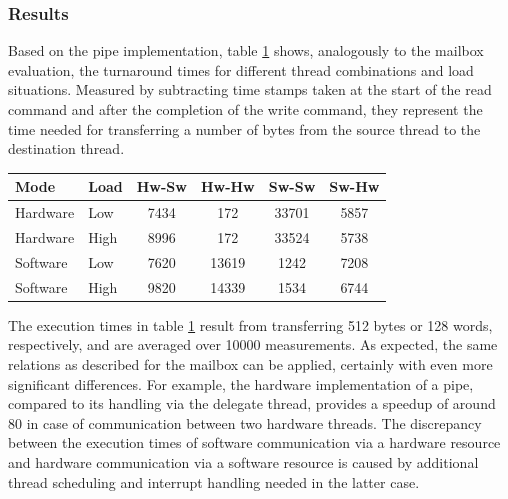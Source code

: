 \subsubsection{Results}
Based on the pipe implementation, table \ref{tab:pipe_turn} shows, analogously
to the mailbox evaluation, the turnaround times for different thread
combinations and load situations. Measured by subtracting time stamps taken at
the start of the read command and after the completion of the write command, they represent the time needed for transferring a number of bytes from the source thread to the destination thread.
\begin{table}
	\scriptsize
	\centering
	\label{tab:pipe_turn}
	\begin{tabular}{llcccc}
	\hline
	\textbf{Mode} & \textbf{Load} & \textbf{Hw-Sw} & \textbf{Hw-Hw} & \textbf{Sw-Sw} & \textbf{Sw-Hw}\\
	\hline
	Hardware & Low & 7434 & 172 & 33701 & 5857\\
	Hardware & High & 8996 & 172 & 33524 & 5738\\
	Software & Low & 7620 & 13619 & 1242 & 7208\\
	Software & High & 9820 & 14339 & 1534 & 6744\\
	\hline
	\end{tabular}
\end{table}
The execution times in table \ref{tab:pipe_turn} result from transferring 512
bytes or 128 words, respectively, and are averaged over 10000 measurements. As
expected, the same relations as described for the mailbox can be applied,
certainly with even more significant differences. For example, the hardware
implementation of a pipe, compared to its handling via the delegate thread,
provides a speedup of around 80 in case of communication between two hardware
threads. The discrepancy between the execution times of software communication
via a hardware resource and hardware communication via a software resource is
caused by additional thread scheduling and interrupt handling needed in the
latter case.


